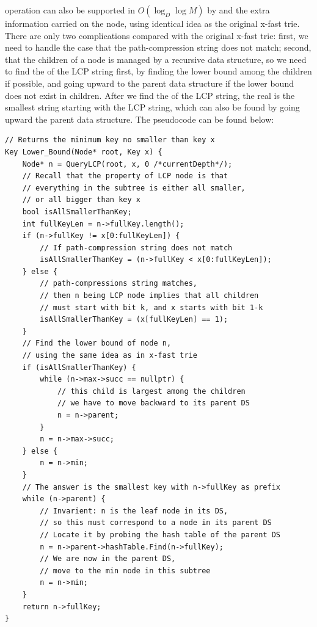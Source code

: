 \documentclass[11pt, usletter]{article}
\begin{document}
\lowerbound operation can also be supported in $O(\log_D\log M)$ by \QueryLCP and the extra information 
carried on the node, using identical idea as the original x-fast trie. 
There are only two complications compared with the original x-fast trie: 
first, we need to handle the case that the path-compression string does not match; 
second, that the children of a node is managed by a recursive data structure, 
so we need to find the \lowerbound of the LCP string first, 
by finding the lower bound among the children if possible, 
and going upward to the parent data structure if the lower bound does not exist in children.
After we find the \lowerbound of the LCP string, 
the real \lowerbound is the smallest string starting with the LCP string, 
which can also be found by going upward the parent data structure.
The pseudocode can be found below:

\singlespacing\begin{codebox}
\begin{verbatim}
// Returns the minimum key no smaller than key x
Key Lower_Bound(Node* root, Key x) {
    Node* n = QueryLCP(root, x, 0 /*currentDepth*/);
    // Recall that the property of LCP node is that 
    // everything in the subtree is either all smaller, 
    // or all bigger than key x
    bool isAllSmallerThanKey;
    int fullKeyLen = n->fullKey.length();
    if (n->fullKey != x[0:fullKeyLen]) {
        // If path-compression string does not match
        isAllSmallerThanKey = (n->fullKey < x[0:fullKeyLen]);
    } else {
        // path-compressions string matches, 
        // then n being LCP node implies that all children 
        // must start with bit k, and x starts with bit 1-k
        isAllSmallerThanKey = (x[fullKeyLen] == 1);
    }
    // Find the lower bound of node n, 
    // using the same idea as in x-fast trie
    if (isAllSmallerThanKey) {
        while (n->max->succ == nullptr) {
            // this child is largest among the children
            // we have to move backward to its parent DS
            n = n->parent;
        }
        n = n->max->succ;
    } else {
        n = n->min;
    }
    // The answer is the smallest key with n->fullKey as prefix
    while (n->parent) {
        // Invarient: n is the leaf node in its DS,
        // so this must correspond to a node in its parent DS
        // Locate it by probing the hash table of the parent DS
        n = n->parent->hashTable.Find(n->fullKey);
        // We are now in the parent DS, 
        // move to the min node in this subtree 
        n = n->min;
    }
    return n->fullKey;
}
\end{verbatim}
\end{codebox}\doublespacing
\end{document}
